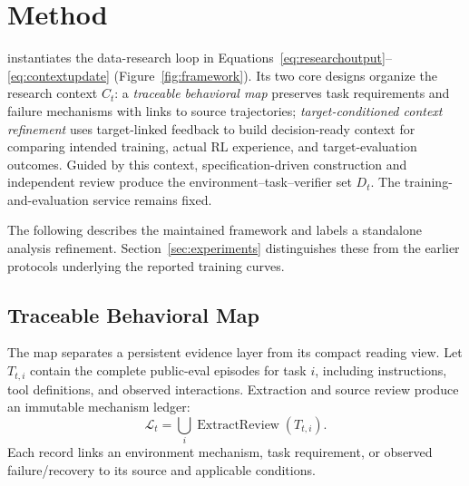 \section{Method}
\label{sec:method}

\method{} instantiates the data-research loop in
Equations~\ref{eq:researchoutput}--\ref{eq:contextupdate}
(Figure~\ref{fig:framework}). Its two core
designs organize the research context $C_t$: a \emph{traceable behavioral map}
preserves task requirements and failure mechanisms with links to source
trajectories; \emph{target-conditioned context refinement} uses target-linked
feedback to build decision-ready context for comparing intended training,
actual RL experience, and target-evaluation outcomes.
Guided by this context, specification-driven
construction and independent review produce the environment--task--verifier
set $D_t$. The training-and-evaluation service remains fixed.

The following describes the maintained framework and labels a standalone
analysis refinement. Section~\ref{sec:experiments} distinguishes these from the earlier protocols
underlying the reported training curves.



\subsection{Traceable Behavioral Map}
\label{sec:diagnosis}

The map separates a persistent evidence layer from its compact reading view.
Let $T_{t,i}$ contain the complete public-eval episodes for task $i$, including
instructions, tool definitions, and observed interactions. Extraction and
source review produce an immutable mechanism ledger:
\begin{equation}
\mathcal L_t=\bigcup_i \operatorname{ExtractReview}(T_{t,i}).
\label{eq:mechanismledger}
\end{equation}
Each record links an environment mechanism, task requirement, or observed
failure/recovery to its source and applicable conditions.

